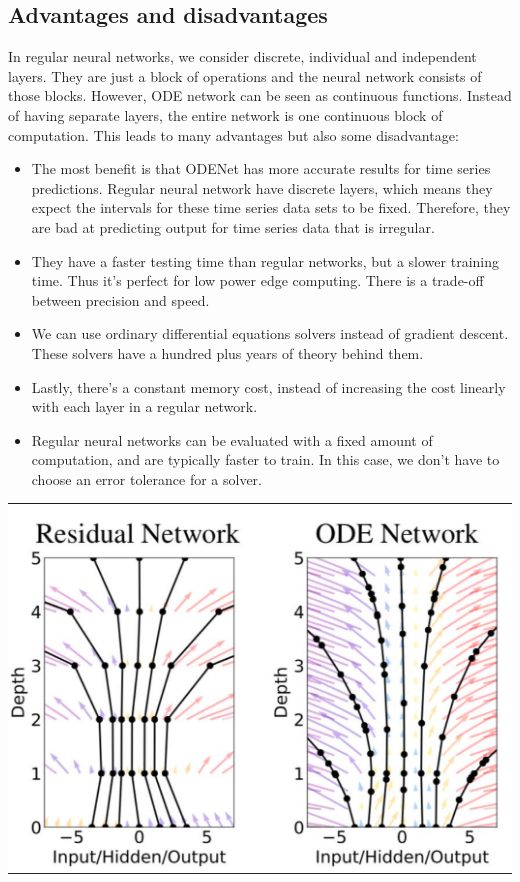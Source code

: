 \documentclass[10pt,a4paper]{article}
\theoremstyle{definition}
\theoremstyle{definition}
\begin{document}
 


\subsection{Advantages and disadvantages}

In regular neural networks, we consider discrete, individual and independent layers. They are just a block of operations and the neural network consists of those blocks. However, ODE network can be seen as continuous functions. Instead of having separate layers, the entire network is one continuous block of computation. This leads to many advantages but also some disadvantage:
\begin{itemize}
\item The most benefit is that ODENet has more accurate results for time series predictions. Regular neural network have discrete layers, which means they expect the intervals for these time series data sets to be fixed. Therefore, they are bad at predicting output for time series data that is irregular.
\item They have a faster testing time than regular networks, but a slower training time. Thus it's perfect for low power edge computing. There is a trade-off between precision and speed.
\item We can use ordinary differential equations solvers instead of gradient descent. These solvers have a hundred plus years of theory behind them.
\item Lastly, there's a constant memory cost, instead of increasing the cost linearly with each layer in a regular network.
\item Regular neural networks can be evaluated with a fixed amount of computation, and are typically faster to train. In this case, we don't have to choose an error tolerance for a solver.
\end{itemize}

\begin{center}
\includegraphics[scale=0.7]{resnetvsodenet.png}
\end{center}


\end{document}

